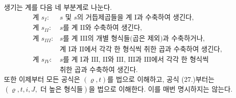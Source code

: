 
생기는 계를 다음 네 부분계로 나눈다.
\[
\begin{array}{ll}
\text{계 }s_I:&s\text{ 및 }s\text{의 거듭제곱들을 계 I과 수축하여 생긴다,}\\
\text{계 }s_{II}:&s\text{를 계 II와 수축하여 생긴다,}\\
\text{계 }s_{III}:&s\text{를 계 III의 개별 형식들(곱은 제외)과 수축하거나,}\\
&\text{계 I과 II에서 각각 한 형식씩 취한 곱과 수축하여 생긴다,}\\
\text{계 }s_{IV}:&s\text{를 계 I과 III, II와 III, III과 III에서 각각 한 형식씩}\\
&\text{취한 곱과 수축하여 생긴다.}
\end{array}
\]
또한 이제부터 모든 공식은 $(\varrho,t)$를 법으로 이해하고, 공식 (27.)부터는 $(\varrho,t,i,J,\text{ 더 높은 형식들})$을 법으로 이해한다. 이를 매번 명시하지는 않는다.

